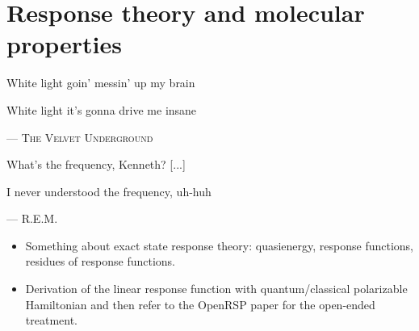 \chapter{Response theory and molecular properties}\label{ch:molprop}

\epigraph{
White light goin' messin' up my brain

White light it's gonna drive me insane
}{
--- \textsc{The Velvet Underground}
}
\epigraph{What's the frequency, Kenneth? [...]

          I never understood the frequency, uh-huh}{
          --- \textsc{R.E.M.}}

\begin{itemize}
    \item Something about exact state response theory: quasienergy,
      response functions, residues of response functions.~\autocite{}
    \item  Derivation of the linear response function with
      quantum/classical polarizable Hamiltonian and then refer to the
      OpenRSP paper for the open-ended treatment.~\autocite{pcm-openrsp}
\end{itemize}

